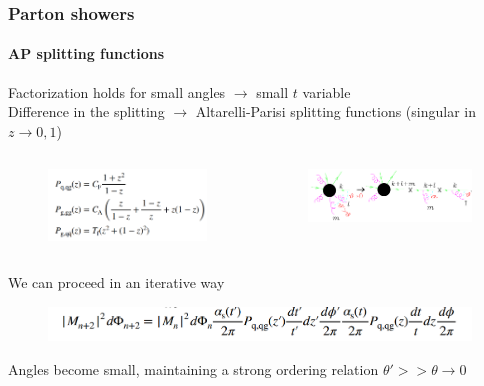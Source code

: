 \documentclass[aspectratio=43]{beamer}
\begin{document}
\begin{frame}

	\frametitle{Parton showers}
	\framesubtitle{AP splitting functions}
	
	\footnotesize Factorization holds for small angles $\rightarrow$ small $t$ variable \\
	\footnotesize Difference in the splitting $\rightarrow$ Altarelli-Parisi splitting functions (singular in $z \rightarrow 0, 1$)
	
		
	\begin{columns}
	
			 
		\begin{figure}
			\includegraphics[width = 5 cm]{plots/AP_splitting.png}
		\end{figure}
		
		
		\begin{figure}
			\includegraphics[width = 6.5 cm]{plots/AP_iteration_plot.png}
		\end{figure}

	\end{columns}

	\vspace{0.4cm}
	
	\footnotesize We can proceed in an iterative way	
	\begin{figure}
		\includegraphics[width = 9 cm]{plots/AP_iteration_eq.png}
	\end{figure}

	\footnotesize Angles become small, maintaining a strong ordering relation $\theta' >> \theta \rightarrow 0$
	
\end{frame}
\end{document}
